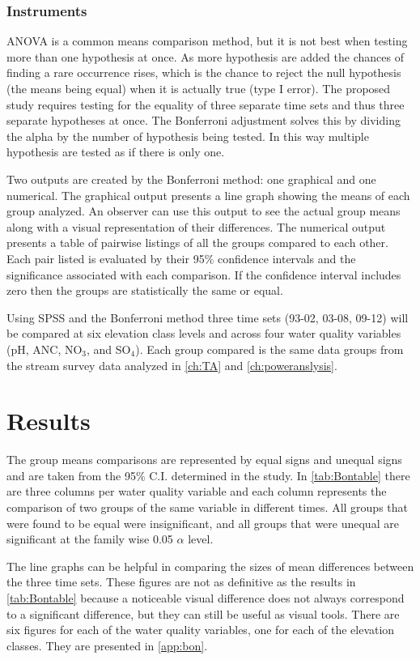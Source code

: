 \subsubsection{Instruments}
ANOVA is a common means comparison method, but it is not best when testing more than one hypothesis at once.
As more hypothesis are added the chances of finding a rare occurrence rises, which is the chance to reject the null hypothesis (the means being equal) when it is actually true (type I error).
The proposed study requires testing for the equality of three separate time sets and thus three separate hypotheses at once.
The Bonferroni adjustment solves this by dividing the alpha by the number of hypothesis being tested.
In this way multiple hypothesis are tested as if there is only one.

Two outputs are created by the Bonferroni method: one graphical and one numerical.
The graphical output presents a line graph showing the means of each group analyzed.
An observer can use this output to see the actual group means along with a visual representation of their differences.
The numerical output presents a table of pairwise listings of all the groups compared to each other.
Each pair listed is evaluated by their 95$\%$ confidence intervals and the significance associated with each comparison.
If the confidence interval includes zero then the groups are statistically the same or equal.

Using SPSS and the Bonferroni method three time sets (93-02, 03-08, 09-12) will be compared at six elevation class levels and across four water quality variables (pH, ANC, NO$_3$, and SO$_4 $).
Each group compared is the same data groups from the stream survey data analyzed in \autoref{ch:TA} and \autoref{ch:poweranslysis}.

\section{Results}


The group means comparisons are represented by equal signs and unequal signs and are taken from the 95$\%$ C.I. determined in the study.
In \autoref{tab:Bontable} there are three columns per water quality variable and each column represents the comparison of two groups of the same variable in different times.
All groups that were found to be equal were insignificant, and all groups that were unequal are significant at the family wise 0.05 $\alpha$ level.

The line graphs can be helpful in comparing the sizes of mean differences between the three time sets.
These figures are not as definitive as the results in \autoref{tab:Bontable} because a noticeable visual difference does not always correspond to a significant difference, but they can still be useful as visual tools.
There are six figures for each of the water quality variables, one for each of the elevation classes.
They are presented in \autoref{app:bon}.

